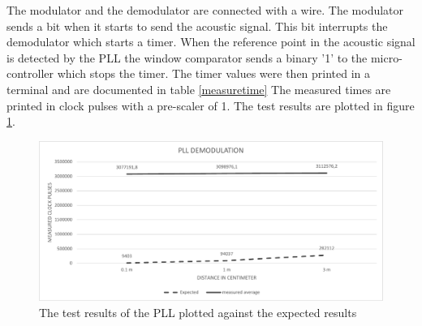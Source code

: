 \documentclass[10pt,a4paper]{article}
\begin{document}
\begin{table}[h]
\centering
{}
\caption{Measured times in clock pulses, pre scaler is set to 1 }
\label{measuretime}
\end{table}

The modulator and the demodulator are connected with a wire. The modulator sends a bit when it starts to send the acoustic signal. This bit interrupts the demodulator which starts a timer. When the reference point in the acoustic signal is detected by the PLL the window comparator sends a binary '1' to the micro-controller which stops the timer. The timer values were then printed in a terminal and are documented in table \ref{measuretime} The measured times are printed in clock pulses with a pre-scaler of 1. The test results are plotted in figure \ref{fig:testplotpll}.

\begin{figure}[H]
   \centering
   \includegraphics[width=\textwidth]{pllgrafiek.pdf}
   \caption{The test results of the PLL plotted against the expected results}
   \label{fig:testplotpll}
\end{figure}
\end{document}
